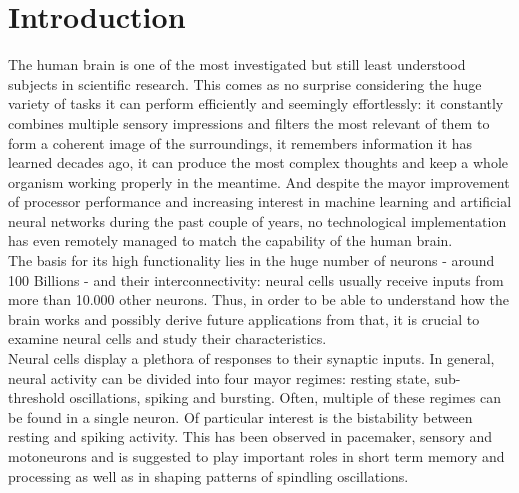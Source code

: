 \documentclass[12pt,a4paper]{article}
\begin{document}

 

\maketitle

\thispagestyle{empty}
\newpage

\tableofcontents
\thispagestyle{empty}
\newpage
{}

\section{Introduction}

The human brain is one of the most investigated but still least understood subjects in scientific research. This comes as no surprise considering the huge variety of tasks it can perform efficiently and seemingly effortlessly: it constantly combines multiple sensory impressions and filters the most relevant of them to form a coherent image of the surroundings, it remembers information it has learned decades ago, it can produce the most complex thoughts and keep a whole organism working properly in the meantime. And despite the mayor improvement of processor performance and increasing interest in machine learning and artificial neural networks during the past couple of years, no technological implementation has even remotely managed to match the capability of the human brain.\\
The basis for its high functionality lies in the huge number of neurons - around 100 Billions\cite{eqnum} - and their interconnectivity: neural cells usually receive inputs from more than 10.000 other neurons\cite{izi}. Thus, in order to be able to understand how the brain works and possibly derive future applications from that, it is crucial to examine neural cells and study their characteristics. \\
Neural cells display a plethora of responses to their synaptic inputs. In general, neural activity can be divided into four mayor regimes: resting state, sub-threshold oscillations, spiking and bursting\cite{dnb}. Often, multiple of these regimes can be found in a single neuron. Of particular interest is the bistability between resting and spiking activity. This has been observed in pacemaker\cite{pacemaker}, sensory \cite{sensory}\cite{sensorystm1} and motoneurons\cite{moto1}\cite{moto2} and is suggested to play important roles in short term memory and processing\cite{sensorystm1}\cite{stm1}\cite{stm2} as well as in shaping patterns of spindling oscillations\cite{spindle}.
\end{document}
